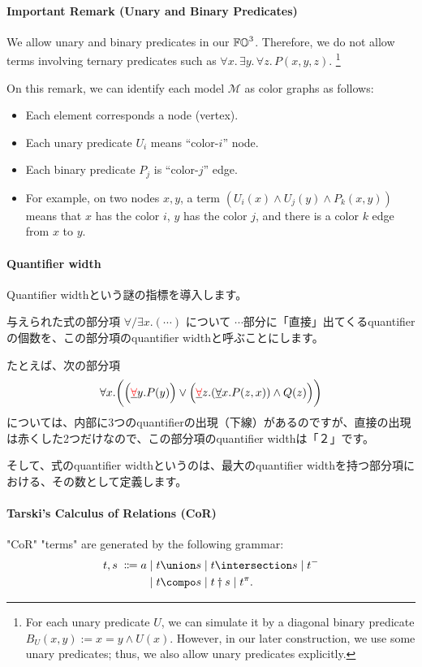 \paragraph*{Important Remark (Unary and Binary Predicates)}
We allow unary and binary predicates in our $\mathbb{FO}^3$.
Therefore, we do not allow terms involving ternary predicates such as $\forall x.\,\exists y.\,\forall z.\, P(x, y, z)$.%
\footnote{For each unary predicate $U$, we can simulate it by a diagonal binary predicate $B_U(x, y) := x = y \land U(x)$. However, in our later construction, we use some unary predicates; thus, we also allow unary predicates explicitly.}

On this remark, we can identify each model $\mathcal{M}$ as color graphs as follows:
\begin{itemize}
\item Each element corresponds a node (vertex).
\item Each unary predicate $U_i$ means ``color-$i$'' node.
\item Each binary predicate $P_j$ is ``color-$j$'' edge.
\item For example, on two nodes $x, y$, a term $(U_i(x) \land U_j(y) \land P_k(x, y))$ means that $x$ has the color $i$, $y$ has the color $j$, and there is a color $k$ edge from $x$ to $y$.
\end{itemize}

\paragraph*{Quantifier width}
\begin{Jcomment}
Quantifier widthという謎の指標を導入します。

与えられた式の部分項 $\forall/\exists x. ( \cdots )$ について $\cdots$部分に「直接」出てくるquantifierの個数を、この部分項のquantifier widthと呼ぶことにします。

たとえば、次の部分項
$$
\forall x.\biggl( \Bigl(\underline{{\color{red}\forall}} y. P(y)\Bigr) \lor \Bigl(\underline{{\color{red}\forall}} z. (\underline{\forall} x. P(z, x)) \land Q(z)\Bigr) \biggr)
$$
については、内部に3つのquantifierの出現（下線）があるのですが、直接の出現は赤くした2つだけなので、この部分項のquantifier widthは「２」です。

そして、式のquantifier widthというのは、最大のquantifier widthを持つ部分項における、その数として定義します。
\end{Jcomment}

\paragraph*{Tarski's Calculus of Relations (CoR)}
"CoR" "terms" are generated by the following grammar:
\begin{align*}
    \term[1], \term[2] \;\Coloneqq\;
    & a \mid \term[1] \union \term[2] \mid \term[1] \intersection \term[2] \mid \term[1]^{-}\\
    & \phantom{a} \mid \term[1] \compo \term[2] \mid \term[1] \dagger \term[2] \mid \term[1]^{\pi}.  
\end{align*}


